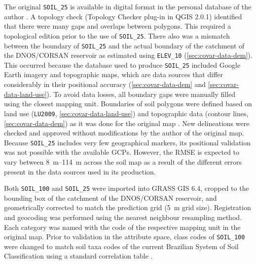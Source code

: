 The original \texttt{SOIL\_25} is available in digital format in the personal database of the author 
\cite{Miguel2010}. A topology check (Topology Checker plug-in in QGIS 2.0.1) identified that there
were many gaps and overlaps between polygons. This required a topological edition prior to the 
use of \texttt{SOIL\_25}. There also was a mismatch between the boundary of \texttt{SOIL\_25} and 
the actual boundary of the catchment of the DNOS/CORSAN reservoir as estimated using 
\texttt{ELEV\_10} (\autoref{sec:covar-data-dem}). This occurred because the database used to 
produce \texttt{SOIL\_25} included Google Earth imagery\textregistered{} and topographic maps, which 
are data sources that differ considerably in their positional accuracy 
(\autoref{sec:covar-data-dem} and \autoref{sec:covar-data-land-use}). To avoid data losses, all 
boundary gaps were manually filled using the closest mapping unit. Boundaries of soil polygons were 
defined based on land use (\texttt{LU2009}, \autoref{sec:covar-data-land-use}) and topographic data 
(contour lines, \autoref{sec:covar-data-dem}) as it was done for the original map \cite{Miguel2010}. 
New delineations were checked and approved without modifications by the author of the original map. 
Because \texttt{SOIL\_25} includes very few geographical markers, its positional validation was not 
possible with the available GCPs. However, the RMSE is expected to vary between 
\SIrange{8}{114}{\metre} across the soil map as a result of the different errors present in the 
data sources used in its production.

Both \texttt{SOIL\_100} and \texttt{SOIL\_25} were imported into GRASS GIS 6.4, cropped to the 
bounding box of the catchment of the DNOS/CORSAN reservoir, and geometrically corrected to match the 
prediction grid (\SI{5}{\metre} grid size). Registration and geocoding was performed using the 
nearest neighbour resampling method. Each category was named with the code of the respective 
mapping unit in the original map. Prior to validation in the attribute space, class codes of 
\texttt{SOIL\_100} were changed to match soil taxa codes of the current Brazilian System of Soil 
Classification using a standard correlation table \cite{SantosEtAl2006}.


